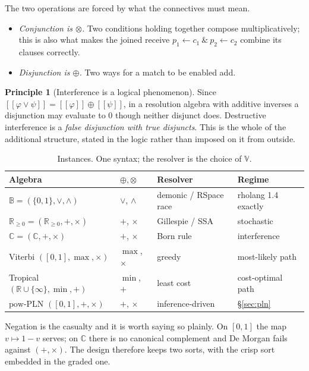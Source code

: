 \documentclass[11pt,a4paper]{article}
\theoremstyle{plain}
\theoremstyle{definition}
\newtheorem{principle}[theorem]{Principle}
\theoremstyle{remark}
\newcommand{\sem}[1]{[\![#1]\!]}
\newcommand{\V}{\mathbb{V}}
\newcommand{\Bool}{\mathbb{B}}
\newcommand{\Rnn}{\mathbb{R}_{\geq 0}}
\newcommand{\Cx}{\mathbb{C}}
\newcommand{\tensorv}{\otimes}
\newcommand{\sumv}{\oplus}
\newcommand{\pow}{\mathrm{pow}}
\begin{document}
The two operations are forced by what the connectives must mean.

\begin{itemize}[leftmargin=1.4em,itemsep=2pt]
\item \emph{Conjunction is $\tensorv$.} Two conditions holding together compose
multiplicatively; this is also what makes the joined receive
$p_1 \leftarrow c_1\ \&\ p_2 \leftarrow c_2$ combine its clauses correctly.
\item \emph{Disjunction is $\sumv$.} Two ways for a match to be enabled add.
\end{itemize}

\begin{principle}[Interference is a logical phenomenon]\label{prin:or}
Since $\sem{\varphi \vee \psi} = \sem{\varphi} \sumv \sem{\psi}$, in a resolution
algebra with additive inverses a disjunction may evaluate to $0$ though neither
disjunct does. Destructive interference is a \emph{false disjunction with true
disjuncts}. This is the whole of the additional structure, stated in the logic
rather than imposed on it from outside.
\end{principle}

\begin{table}[t]
\centering
\small
\begin{tabular}{@{}llll@{}}
\toprule
\textbf{Algebra} & \textbf{$\sumv,\tensorv$} & \textbf{Resolver} & \textbf{Regime}\\
\midrule
$\Bool = (\{0,1\},\vee,\wedge)$ & $\vee$, $\wedge$ & demonic / RSpace race & rholang 1.4 exactly \\
$\Rnn = (\mathbb{R}_{\geq 0},+,\times)$ & $+$, $\times$ & Gillespie / SSA & stochastic \\
$\Cx = (\mathbb{C},+,\times)$ & $+$, $\times$ & Born rule & interference \\
Viterbi $([0,1],\max,\times)$ & $\max$, $\times$ & greedy & most-likely path \\
Tropical $(\mathbb{R}\cup\{\infty\},\min,+)$ & $\min$, $+$ & least cost & cost-optimal path \\
$\pow$-PLN $([0,1],+,\times)$ & $+$, $\times$ & inference-driven & \S\ref{sec:pln} \\
\bottomrule
\end{tabular}
\caption{Instances. One syntax; the resolver is the choice of $\V$.}\label{tab:algebras}
\end{table}

Negation is the casualty and it is worth saying so plainly. On $[0,1]$ the map
$v \mapsto 1 - v$ serves; on $\Cx$ there is no canonical complement and De
Morgan fails against $(+,\times)$. The design therefore keeps two sorts, with the
crisp sort embedded in the graded one.
\end{document}
